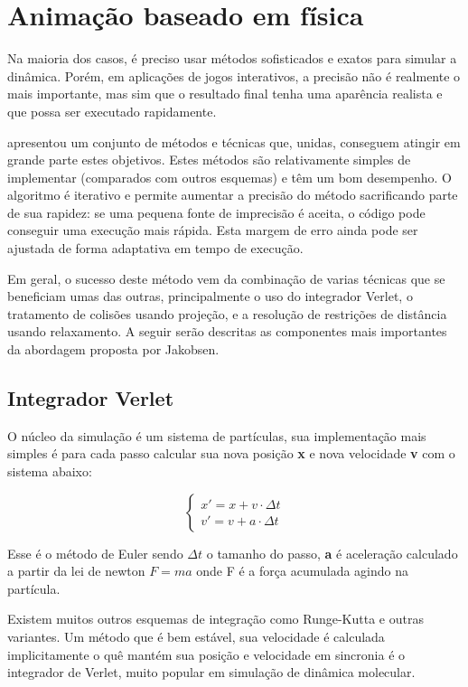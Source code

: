 \chapter{Animação baseado em física}

Na maioria dos casos, é preciso usar métodos sofisticados e exatos para simular a dinâmica. Porém, em aplicações de jogos interativos, a precisão não é realmente o mais importante, mas sim que o resultado final tenha uma aparência realista e que possa ser executado rapidamente. 

 apresentou um conjunto de métodos e técnicas que, unidas, conseguem atingir em grande parte estes objetivos. Estes métodos são relativamente simples de implementar (comparados com outros esquemas) e têm um bom desempenho. O algoritmo é iterativo e permite aumentar a precisão do método sacrificando parte de sua rapidez: se uma pequena fonte de imprecisão é aceita, o código pode conseguir uma execução mais rápida. Esta margem de erro ainda pode ser ajustada de forma adaptativa em tempo de execução.

Em geral, o sucesso deste método vem da combinação de varias técnicas que se beneficiam umas das outras, principalmente o uso do integrador Verlet, o tratamento de colisões usando projeção, e a resolução de restrições de distância usando relaxamento. A seguir serão descritas as componentes mais importantes da abordagem proposta por Jakobsen.

\section{Integrador Verlet}

O núcleo da simulação é um sistema de partículas, sua implementação mais simples é para cada passo calcular sua nova posição \textbf{x} e nova velocidade \textbf{v} com o sistema abaixo:

$$
\begin{cases}
	x' = x + v \cdot \Delta t \\
	v' = v + a \cdot \Delta t
\end{cases}
$$


Esse é o método de Euler sendo $\Delta t$ o tamanho do passo, \textbf{a} é aceleração calculado a partir da lei de newton $F = ma$ onde F é a força acumulada agindo na partícula.

Existem muitos outros esquemas de integração como Runge-Kutta e outras variantes. Um método que é bem estável, sua velocidade é calculada implicitamente o quê mantém sua posição e velocidade em sincronia é o integrador de Verlet, muito popular em simulação de dinâmica molecular.

